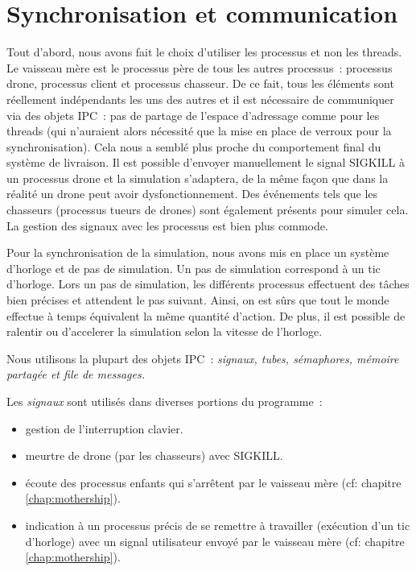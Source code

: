 \chapter{Synchronisation et communication}

Tout d'abord, nous avons fait le choix d'utiliser les processus et non les threads.
Le vaisseau mère est le processus père de tous les autres processus : processus drone, processus client et processus chasseur.
De ce fait, tous les éléments sont réellement indépendants les uns des autres et il est nécessaire de communiquer via
des objets IPC : pas de partage de l'espace d'adressage comme pour les threads (qui n'auraient alors nécessité que
la mise en place de verroux pour la synchronisation). Cela nous a semblé plus proche
du comportement final du système de livraison. Il est possible d'envoyer manuellement le signal SIGKILL à un processus
drone et la simulation s'adaptera, de la même façon que dans la réalité un drone peut avoir dysfonctionnement.
Des événements tels que les chasseurs (processus tueurs de drones) sont également présents pour simuler cela.
La gestion des signaux avec les processus est bien plus commode.

Pour la synchronisation de la simulation, nous avons mis en place un système d'horloge et de pas de simulation. Un pas
de simulation correspond à un tic d'horloge. Lors un pas de simulation, les différents processus effectuent des tâches
bien précises et attendent le pas suivant. Ainsi, on est sûrs que tout le monde effectue à temps équivalent la même
quantité d'action. De plus, il est possible de ralentir ou d'accelerer la simulation selon la vitesse de l'horloge.

Nous utilisons la plupart des objets IPC : \emph{signaux, tubes, sémaphores, mémoire partagée et file de messages.}

Les \emph{signaux} sont utilisés dans diverses portions du programme :
\begin{itemize}
    \item gestion de l'interruption clavier.
    \item meurtre de drone (par les chasseurs) avec SIGKILL.
    \item écoute des processus enfants qui s'arrêtent par le vaisseau mère (cf: chapitre \ref{chap:mothership}).
    \item indication à un processus précis de se remettre à travailler (exécution d'un tic d'horloge) avec un signal utilisateur
        envoyé par le vaisseau mère (cf: chapitre \ref{chap:mothership}).
\end{itemize}

